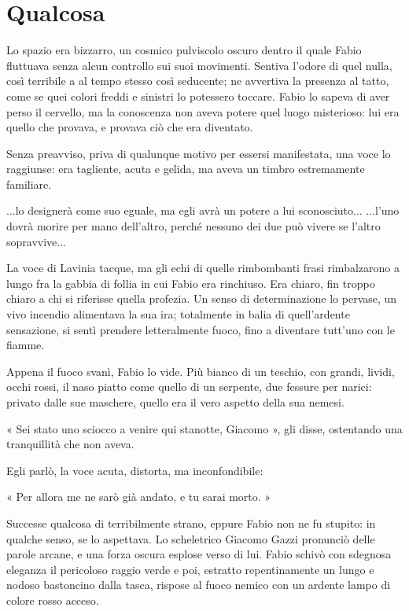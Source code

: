 \chapter{Qualcosa}

Lo spazio era bizzarro, un cosmico pulviscolo oscuro dentro il quale Fabio fluttuava senza alcun controllo sui suoi movimenti. Sentiva l'odore di quel nulla, così terribile a al tempo stesso così seducente; ne avvertiva la presenza al tatto, come se quei colori freddi e sinistri lo potessero toccare. Fabio lo sapeva di aver perso il cervello, ma la conoscenza non aveva potere quel luogo misterioso: lui era quello che provava, e provava ciò che era diventato.

Senza preavviso, priva di qualunque motivo per essersi manifestata, una voce lo raggiunse: era tagliente, acuta e gelida, ma aveva un timbro estremamente familiare.

...lo designerà come suo eguale, ma egli avrà un potere a lui sconosciuto...
...l'uno dovrà morire per mano dell'altro, perché nessuno dei due può vivere se l'altro sopravvive...

La voce di Lavinia tacque, ma gli echi di quelle rimbombanti frasi rimbalzarono a lungo fra la gabbia di follia in cui Fabio era rinchiuso. Era chiaro, fin troppo chiaro a chi si riferisse quella profezia. Un senso di determinazione lo pervase, un vivo incendio alimentava la sua ira; totalmente in balia di quell'ardente sensazione, si sentì prendere letteralmente fuoco, fino a diventare tutt'uno con le fiamme.

Appena il fuoco svanì, Fabio lo vide. Più bianco di un teschio, con grandi, lividi, occhi rossi, il naso piatto come quello di un serpente, due fessure per narici: privato dalle sue maschere, quello era il vero aspetto della sua nemesi.

« Sei stato uno sciocco a venire qui stanotte, Giacomo », gli disse, ostentando una tranquillità che non aveva.

Egli parlò, la voce acuta, distorta, ma inconfondibile:

« Per allora me ne sarò già andato, e tu sarai morto. »

Successe qualcosa di terribilmente strano, eppure Fabio non ne fu stupito: in qualche senso, se lo aspettava. Lo scheletrico Giacomo Gazzi pronunciò delle parole arcane, e una forza oscura esplose verso di lui. Fabio schivò con sdegnosa eleganza il pericoloso raggio verde e poi, estratto repentinamente un lungo e nodoso bastoncino dalla tasca, rispose al fuoco nemico con un ardente lampo di colore rosso acceso.

